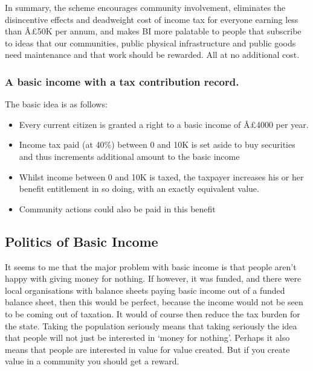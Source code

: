 \documentclass[]{tufte-handout}
\providecommand{\tightlist}{%
  \setlength{\itemsep}{0pt}\setlength{\parskip}{0pt}}
\begin{document}
In summary, the scheme encourages community involvement, eliminates the
disincentive effects and deadweight cost of income tax for everyone
earning less than Â£50K per annum, and makes BI more palatable to people
that subscribe to ideas that our communities, public physical
infrastructure and public goods need maintenance and that work should be
rewarded. All at no additional cost.

\hypertarget{a-basic-income-with-a-tax-contribution-record.}{%
\subsubsection{A basic income with a tax contribution
record.}\label{a-basic-income-with-a-tax-contribution-record.}}

The basic idea is as follows:

\begin{itemize}
\tightlist
\item
  Every current citizen is granted a right to a basic income of Â£4000
  per year.
\item
  Income tax paid (at 40\%) between 0 and 10K is set aside to buy
  securities and thus increments additional amount to the basic income
\item
  Whilst income between 0 and 10K is taxed, the taxpayer increases his
  or her benefit entitlement in so doing, with an exactly equivalent
  value.
\item
  Community actions could also be paid in this benefit
\end{itemize}

\hypertarget{politics-of-basic-income}{%
\subsection{Politics of Basic Income}\label{politics-of-basic-income}}

It seems to me that the major problem with basic income is that people
aren't happy with giving money for nothing. If however, it was funded,
and there were local organisations with balance sheets paying basic
income out of a funded balance sheet, then this would be perfect,
because the income would not be seen to be coming out of taxation. It
would of course then reduce the tax burden for the state. Taking the
population seriously means that taking seriously the idea that people
will not just be interested in `money for nothing'. Perhaps it also
means that people are interested in value for value created. But if you
create value in a community you should get a reward.
\end{document}

